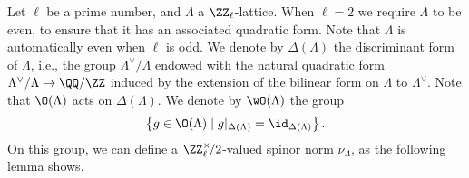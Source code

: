 Let $\ell$ be a prime number, and $\Lambda$ a $\ZZ_{\ell}$-lattice. When $\ell = 2$ we require $\Lambda$ to be even, to ensure that it has an associated quadratic form. Note that $\Lambda$ is automatically even when $\ell$ is odd. We denote by $\Delta(\Lambda)$ the discriminant form of $\Lambda$, i.e., the group $\Lambda^{\vee}/\Lambda$ endowed with the natural quadratic form $\Lambda^{\vee}/\Lambda \rightarrow \QQ/\ZZ$ induced by the extension of the bilinear form on $\Lambda$ to $\Lambda^{\vee}$. Note that $\O(\Lambda)$ acts on $\Delta(\Lambda)$. We denote by $\wO(\Lambda)$ the group
$$
\left\{ g \in \O(\Lambda) \mid g|_{\Delta(\Lambda)} = \id_{\Delta(\Lambda)} \right\}.
$$
On this group, we can define a $\ZZ_{\ell}^{\times}\!/2$-valued spinor norm $\nu_{\Lambda}$, as the following lemma shows. 


